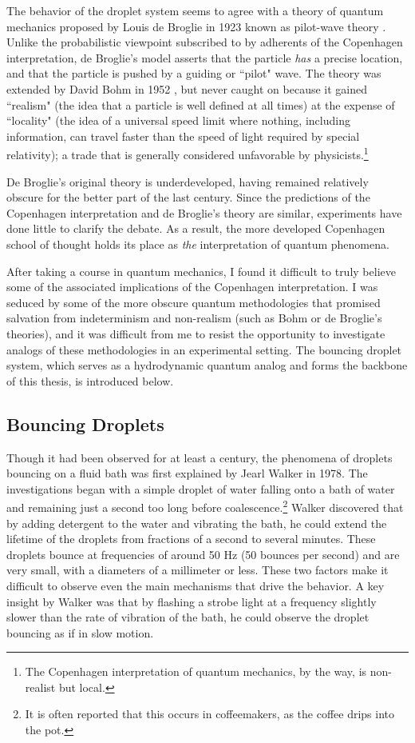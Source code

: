     The behavior of the droplet system seems to agree with a theory of quantum mechanics proposed by Louis de Broglie in 1923 known as pilot-wave theory . Unlike the probabilistic viewpoint subscribed to by adherents of the Copenhagen interpretation, de Broglie's model asserts that the particle \textit{has} a precise location, and that the particle is pushed by a guiding or ``pilot" wave. The theory was extended by David Bohm in 1952 , but never caught on because it gained ``realism" (the idea that a particle is well defined at all times) at the expense of ``locality" (the idea of a universal speed limit where nothing, including information, can travel faster than the speed of light required by special relativity); a trade that is generally considered unfavorable by physicists.\footnote{The Copenhagen interpretation of quantum mechanics, by the way, is non-realist but local.} 
    
    De Broglie's original theory is underdeveloped, having remained relatively obscure for the better part of the last century. Since the predictions of the Copenhagen interpretation and de Broglie's theory are similar, experiments have done little to clarify the debate. As a result, the more developed Copenhagen school of thought holds its place as \textit{the} interpretation of quantum phenomena. 
    
     After taking a course in quantum mechanics, I found it difficult to truly believe some of the associated implications of the Copenhagen interpretation. I was seduced by some of the more obscure quantum methodologies that promised salvation from indeterminism and non-realism (such as Bohm or de Broglie's theories), and it was difficult from me to resist the opportunity to investigate analogs of these methodologies in an experimental setting. The bouncing droplet system, which serves as a hydrodynamic quantum analog and forms the backbone of this thesis, is introduced below. 
    
	    \subsection*{Bouncing Droplets}
	    Though it had been observed for at least a century, the phenomena of droplets bouncing on a fluid bath was first explained by Jearl Walker in 1978. The investigations began with a simple droplet of water falling onto a bath of water and remaining just a second too long before coalescence.\footnote{It is often reported that this occurs in coffeemakers, as the coffee drips into the pot.} Walker discovered that by adding detergent to the water and vibrating the bath, he could extend the lifetime of the droplets from fractions of a second to several minutes. These droplets bounce at frequencies of around 50 Hz (50 bounces per second) and are very small, with a diameters of a millimeter or less. These two factors make it difficult to observe even the main mechanisms that drive the behavior. A key insight by Walker was that by flashing a strobe light at a frequency slightly slower than the rate of vibration of the bath, he could observe the droplet bouncing as if in slow motion.
	    
